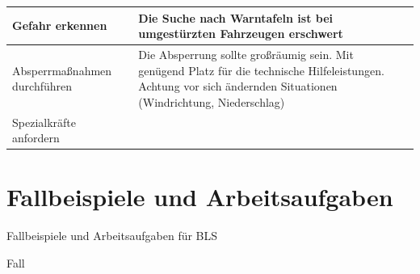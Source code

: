 \documentclass{article}
\begin{document}
\begin{center}
\tablehead{}\begin{supertabular}{|m{2.222cm}|m{5.1460004cm}|m{5.7320004cm}|}
\hline
Gefahr erkennen

 &
Die Suche nach Warntafeln ist bei umgest\"urzten Fahrzeugen erschwert

 &
 \par

\\\hline
Absperr\-ma{\ss}nahmen durch\-f\"uhren

 &
Die Absperrung sollte gro{\ss}r\"aumig  sein. Mit gen\"ugend Platz f\"ur
die technische Hilfeleistungen. Achtung  vor sich \"andernden
Situationen  (Windrichtung, Niederschlag)

 &
 \par

\\\hline
Spezial\-kr\"afte anfordern

 &
 &
 \par

\\\hline
\end{supertabular}
\end{center}
\section{Fallbeispiele und Arbeitsaufgaben}
Fallbeispiele und Arbeitsaufgaben f\"ur BLS

Fall 
\end{document}

